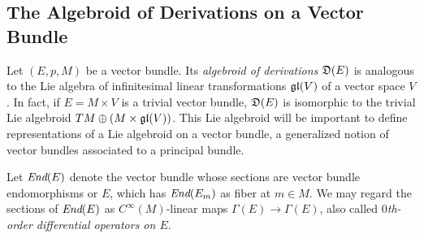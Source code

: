 

\subsection{The Algebroid of Derivations on a Vector Bundle} \label{subsectionDerivationsAlgebroid}




Let $(E, p, M)$ be a vector bundle. Its \emph{algebroid of derivations} $\mathfrak{D}(E)$ is analogous to the Lie algebra of infinitesimal linear transformations $\mathfrak{gl}(V)$ of a vector space $V$. In fact, if $E = M \times V$ is a trivial vector bundle, $\mathfrak{D}(E)$ is isomorphic to the trivial Lie algebroid $TM \oplus (M \times \mathfrak{gl}(V))$. This Lie algebroid will be important to define representations of a Lie algebroid on a vector bundle, a generalized notion of vector bundles associated to a principal bundle.

Let $\operatorname{\textit{End}}(E)$ denote the vector bundle whose sections are vector bundle endomorphisms or $E$, which has $\operatorname{\textit{End}}(E_m)$ as fiber at $m \in M$. We may regard the sections of $\operatorname{\textit{End}}(E)$ as $C^\infty(M)$-linear maps $\Gamma(E) \to \Gamma(E)$, also called \emph{$0$th-order differential operators on $E$}.

